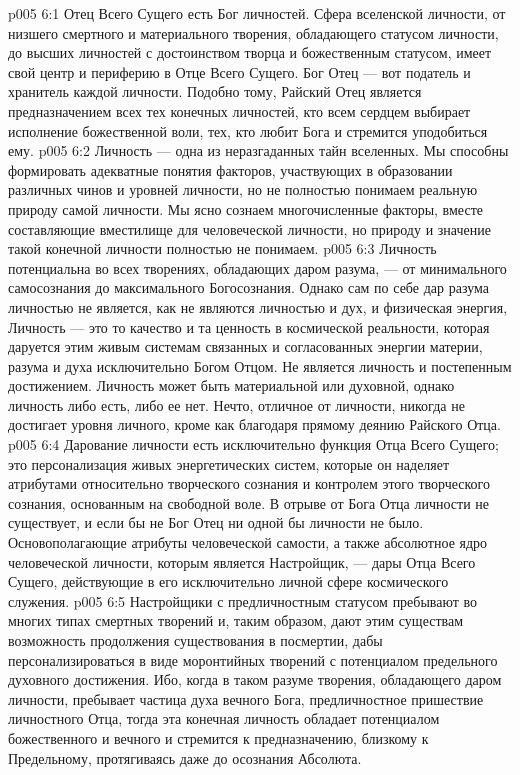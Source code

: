\vs p005 6:1 Отец Всего Сущего есть Бог личностей. Сфера вселенской личности, от низшего смертного и материального творения, обладающего статусом личности, до высших личностей с достоинством творца и божественным статусом, имеет свой центр и периферию в Отце Всего Сущего. Бог Отец --- вот податель и хранитель каждой личности. Подобно тому, Райский Отец является предназначением всех тех конечных личностей, кто всем сердцем выбирает исполнение божественной воли, тех, кто любит Бога и стремится уподобиться ему.
\vs p005 6:2 \pc Личность --- одна из неразгаданных тайн вселенных. Мы способны формировать адекватные понятия факторов, участвующих в образовании различных чинов и уровней личности, но не полностью понимаем реальную природу самой личности. Мы ясно сознаем многочисленные факторы, вместе составляющие вместилище для человеческой личности, но природу и значение такой конечной личности полностью не понимаем.
\vs p005 6:3 Личность потенциальна во всех творениях, обладающих даром разума, --- от минимального самосознания до максимального Богосознания. Однако сам по себе дар разума личностью не является, как не являются личностью и дух, и физическая энергия, Личность --- это то качество и та ценность в космической реальности, которая даруется этим живым системам связанных и согласованных энергии материи, разума и духа исключительно Богом Отцом. Не является личность и постепенным достижением. Личность может быть материальной или духовной, однако личность либо есть, либо ее нет. Нечто, отличное от личности, никогда не достигает уровня личного, кроме как благодаря прямому деянию Райского Отца.
\vs p005 6:4 Дарование личности есть исключительно функция Отца Всего Сущего; это персонализация живых энергетических систем, которые он наделяет атрибутами относительно творческого сознания и контролем этого творческого сознания, основанным на свободной воле. В отрыве от Бога Отца личности не существует, и если бы не Бог Отец ни одной бы личности не было. Основополагающие атрибуты человеческой самости, а также абсолютное ядро человеческой личности, которым является Настройщик, --- дары Отца Всего Сущего, действующие в его исключительно личной сфере космического служения.
\vs p005 6:5 \pc Настройщики с предличностным статусом пребывают во многих типах смертных творений и, таким образом, дают этим существам возможность продолжения существования в посмертии, дабы персонализироваться в виде моронтийных творений с потенциалом предельного духовного достижения. Ибо, когда в таком разуме творения, обладающего даром личности, пребывает частица духа вечного Бога, предличностное пришествие личностного Отца, тогда эта конечная личность обладает потенциалом божественного и вечного и стремится к предназначению, близкому к Предельному, протягиваясь даже до осознания Абсолюта.

